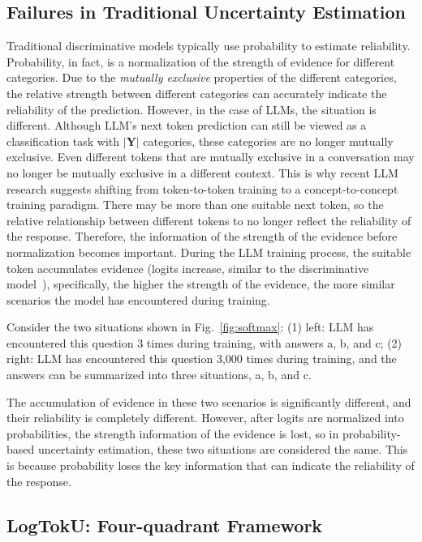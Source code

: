 \subsection{Failures in Traditional Uncertainty Estimation}



Traditional discriminative models typically use probability to estimate reliability. Probability, in fact, is a normalization of the strength of evidence for different categories. Due to the \emph{mutually exclusive} properties of the different categories, the relative strength between different categories can accurately indicate the reliability of the prediction. However, in the case of LLMs, the situation is different. Although LLM's next token prediction can still be viewed as a classification task with $|\bm{Y}|$ categories, these categories are no longer mutually exclusive. Even different tokens that are mutually exclusive in a conversation may no longer be mutually exclusive in a different context. This is why recent LLM research suggests shifting from token-to-token training to a concept-to-concept training paradigm. There may be more than one suitable next token, so the relative relationship between different tokens to no longer reflect the reliability of the response. Therefore, the information of the strength of the evidence before normalization becomes important. During the LLM training process, the suitable token accumulates evidence (logits increase, similar to the discriminative model~\cite{wei2022mitigating}), specifically, the higher the strength of the evidence, the more similar scenarios the model has encountered during training.

Consider the two situations shown in Fig.~\ref{fig:softmax}: (1) left: LLM has encountered this question 3 times during training, with answers a, b, and c; (2) right: LLM has encountered this question 3,000 times during training, and the answers can be summarized into three situations, a, b, and c. 

The accumulation of evidence in these two scenarios is significantly different, and their reliability is completely different. However, after logits are normalized into probabilities, the strength information of the evidence is lost, so in probability-based uncertainty estimation, these two situations are considered the same. This is because probability loses the key information that can indicate the reliability of the response.

\subsection{LogTokU: Four-quadrant Framework}\label{sec:four}

